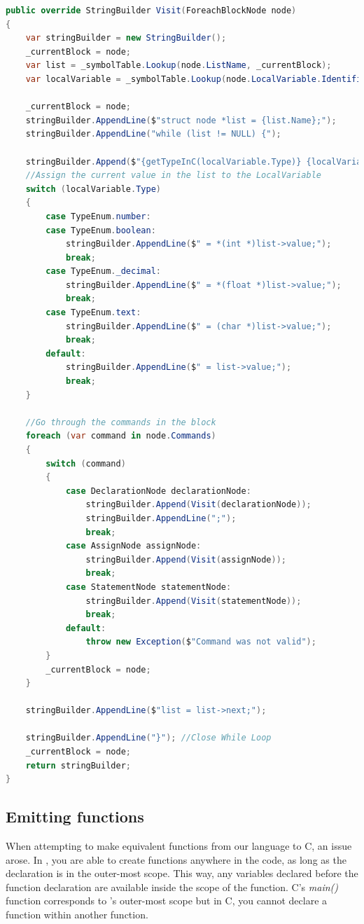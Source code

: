 \begin{lstlisting}[language = csharp, firstnumber=1101, label={list:ForeachLoopEmitter},caption=Emitting the code for the repeat for each loop block - CobraCompiler/Emitter.cs]
public override StringBuilder Visit(ForeachBlockNode node)
{
    var stringBuilder = new StringBuilder();
    _currentBlock = node;
    var list = _symbolTable.Lookup(node.ListName, _currentBlock);
    var localVariable = _symbolTable.Lookup(node.LocalVariable.Identifier.Name, _currentBlock);

    _currentBlock = node;
    stringBuilder.AppendLine($"struct node *list = {list.Name};");
    stringBuilder.AppendLine("while (list != NULL) {");

    stringBuilder.Append($"{getTypeInC(localVariable.Type)} {localVariable.Name}");
    //Assign the current value in the list to the LocalVariable
    switch (localVariable.Type)
    {
        case TypeEnum.number:
        case TypeEnum.boolean:
            stringBuilder.AppendLine($" = *(int *)list->value;");
            break;
        case TypeEnum._decimal:
            stringBuilder.AppendLine($" = *(float *)list->value;");
            break;
        case TypeEnum.text:
            stringBuilder.AppendLine($" = (char *)list->value;");
            break;
        default:
            stringBuilder.AppendLine($" = list->value;");
            break;
    }

    //Go through the commands in the block
    foreach (var command in node.Commands)
    {
        switch (command)
        {
            case DeclarationNode declarationNode:
                stringBuilder.Append(Visit(declarationNode));
                stringBuilder.AppendLine(";");
                break;
            case AssignNode assignNode:
                stringBuilder.Append(Visit(assignNode));
                break;
            case StatementNode statementNode:
                stringBuilder.Append(Visit(statementNode));
                break;
            default:
                throw new Exception($"Command was not valid");
        }
        _currentBlock = node;
    }
    
    stringBuilder.AppendLine($"list = list->next;");

    stringBuilder.AppendLine("}"); //Close While Loop
    _currentBlock = node;
    return stringBuilder;
}
\end{lstlisting}

\subsection{Emitting functions}
\label{emitter:functions}
When attempting to make equivalent functions from our language to C, an issue arose. In \lang, you are able to create functions anywhere in the code, as long as the declaration is in the outer-most scope. This way, any variables declared before the function declaration are available inside the scope of the function. C's \textit{main()} function corresponds to \lang's outer-most scope but in C, you cannot declare a function within another function. \\

